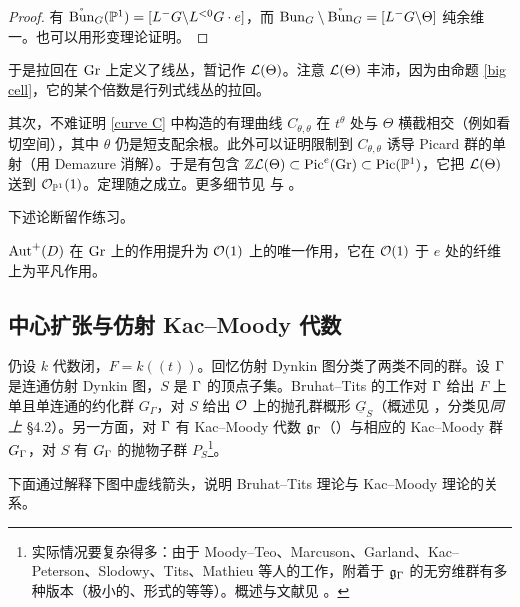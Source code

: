 \begin{proof}
有 $\mathring{{\operatorname{Bun}}}_G({\mathbb P}^1)= [L^-G\backslash L^{<0}G\cdot e]$，而 ${\operatorname{Bun}}_G\setminus \mathring{{\operatorname{Bun}}}_G=[L^-G\backslash \Theta]$ 纯余维一。也可以用形变理论证明。
\end{proof}

于是拉回在 ${\operatorname{Gr}}$ 上定义了线丛，暂记作 ${\mathcal L}(\Theta)$。注意 ${\mathcal L}(\Theta)$ 丰沛，因为由命题 \ref{big cell}，它的某个倍数是行列式线丛的拉回。

其次，不难证明 \eqref{curve C} 中构造的有理曲线 $C_{\theta,\theta}$ 在 $t^\theta$ 处与 $\Theta$ 横截相交（例如看切空间），其中 $\theta$ 仍是短支配余根。此外可以证明限制到 $C_{\theta,\theta}$ 诱导 Picard 群的单射（用 Demazure 消解）。于是有包含 ${\mathbb Z}{\mathcal L}(\Theta)\subset {\operatorname{Pic}}^e({\operatorname{Gr}})\subset{\operatorname{Pic}}({\mathbb P}^1)$，它把 ${\mathcal L}(\Theta)$ 送到 ${\mathcal O}_{{\mathbb P}^1}(1)$。定理随之成立。更多细节见 \cite[Corollary 12]{Fa} 与 \cite[\S~10.2]{So}。

下述论断留作练习。

\begin{lem}\label{lifting Aut action}
${\operatorname{Aut}}^+(D)$ 在 ${\operatorname{Gr}}$ 上的作用提升为 ${\mathcal O}(1)$ 上的唯一作用，它在 ${\mathcal O}(1)$ 于 $e$ 处的纤维上为平凡作用。
\end{lem}

\subsection{中心扩张与仿射 Kac--Moody 代数}\label{Kac-Moody}

仍设 $k$ 代数闭，$F=k((t))$。回忆仿射 Dynkin 图分类了两类不同的群。设 ${\Gamma}$ 是连通仿射 Dynkin 图，$S$ 是 ${\Gamma}$ 的顶点子集。Bruhat--Tits 的工作对 ${\Gamma}$ 给出 $F$ 上单且单连通的约化群 $G_\Gamma$，对 $S$ 给出 ${\mathcal O}$ 上的抛孔群概形 $\underline G_S$（概述见 \cite{Ti}，分类见\emph{同上} \S 4.2）。另一方面，对 ${\Gamma}$ 有 Kac--Moody 代数 ${\mathfrak g}_{\Gamma}$（\cite[Chap. 4]{Kac}）与相应的 Kac--Moody 群 $G_{{\Gamma}}$，对 $S$ 有 $G_{{\Gamma}}$ 的抛物子群 $P_S$\footnote{实际情况要复杂得多：由于 Moody--Teo、Marcuson、Garland、Kac--Peterson、Slodowy、Tits、Mathieu 等人的工作，附着于 ${\mathfrak g}_{\Gamma}$ 的无穷维群有多种版本（极小的、形式的等等）。概述与文献见 \cite{Ti3}。}。

下面通过解释下图中虚线箭头，说明 Bruhat--Tits 理论与 Kac--Moody 理论的关系。
\begin{center}
\end{center}

